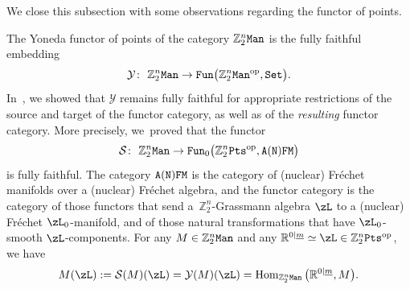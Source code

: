 \documentclass[pdftex]{sigma}%
\newcommand{\op}[1]{\operatorname{#1}}
\newcommand{\R}{{\mathbb R}}
\newcommand{\Z}{{\mathbb Z}}
\def\ul{\underline}
\def\ul{\underline}
\newcommand{\0}{\otimes}
\newcommand{\z}{\Z_2^n}
\numberwithin{equation}{section}
\begin{document}
We close this subsection with some observations regarding the functor of points.

The Yoneda functor of points of the category $\z\tt Man$ is the fully faithful embedding
\[
\mathcal{Y}\colon\ \z{\tt Man}\to {\tt Fun}\big(\z{\tt Man}^{\op{op}},{\tt Set}\big).
\]
In~\cite{Bruce:2019b}, we showed that $\mathcal Y$ remains fully faithful for appropriate restrictions of the source and target of the functor category, as well as of the {\it resulting} functor category. More precisely, we~proved that the functor
\begin{gather}\label{SVYoneda}
\mathcal{S}\colon\ \z{\tt Man}\to{\tt Fun}_0\big(\z{\tt Pts}^{\op{op}},\tt A(N)FM\big)
\end{gather}
is fully faithful. The category $\tt A(N)FM$ is the category of (nuclear) Fr\'echet manifolds over a (nuc\-lear) Fr\'echet algebra, and the functor category is the category of those functors that send a~$\z$-Grassmann algebra $\zL$ to a (nuclear) Fr\'echet $\zL_0$-manifold, and of those natural transformations that have $\zL_0$-smooth $\zL$-components. For any $M\in\z\tt Man$ and any $\R^{0|\ul m}\simeq\zL\in\z{\tt Pts}^{\op{op}}$, we have
\[
M(\zL):=\mathcal{S}(M)(\zL)=\mathcal{Y}(M)(\zL)=\op{Hom}_{\z\tt Man}\big(\R^{0|\ul m},M\big).
\]
\end{document}
